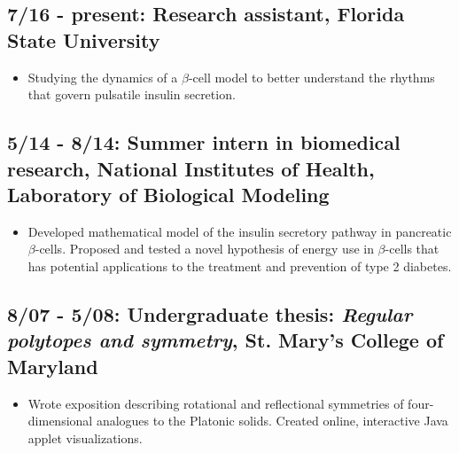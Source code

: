 \documentclass[11pt]{article}
\begin{document}
\subsection*{7/16 - present: Research assistant, Florida State University}
\label{sec:orgheadline7}
\begin{itemize}
\item Studying the dynamics of a \(\beta\)-cell model to better understand the rhythms that govern pulsatile insulin secretion.\\
\end{itemize}
\subsection*{5/14 - 8/14: Summer intern in biomedical research, National Institutes of Health, Laboratory of Biological Modeling}
\label{sec:orgheadline8}
\begin{itemize}
\item Developed mathematical model of the insulin secretory pathway in pancreatic \(\beta\)-cells. Proposed and tested a novel hypothesis of energy use in \(\beta\)-cells that has potential applications to the treatment and prevention of type 2 diabetes.\\
\end{itemize}
\subsection*{8/07 - 5/08: Undergraduate thesis: \emph{Regular polytopes and symmetry}, St. Mary's College of Maryland}
\label{sec:orgheadline9}
\begin{itemize}
\item Wrote exposition describing rotational and reflectional symmetries of four-dimensional analogues to the Platonic solids. Created online, interactive Java applet visualizations.\\
\end{itemize}
\end{document}
